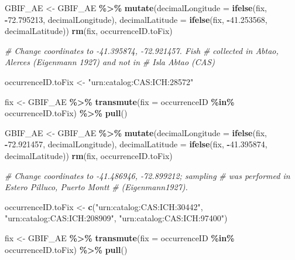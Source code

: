 \documentclass[sn-apa,pdflatex]{sn-jnl}
\newenvironment{Shaded}{\begin{snugshade}}{\end{snugshade}}
\newcommand{\AttributeTok}[1]{\textcolor[rgb]{0.13,0.29,0.53}{#1}}
\newcommand{\CommentTok}[1]{\textcolor[rgb]{0.56,0.35,0.01}{\textit{#1}}}
\newcommand{\FloatTok}[1]{\textcolor[rgb]{0.00,0.00,0.81}{#1}}
\newcommand{\FunctionTok}[1]{\textcolor[rgb]{0.13,0.29,0.53}{\textbf{#1}}}
\newcommand{\NormalTok}[1]{#1}
\newcommand{\OtherTok}[1]{\textcolor[rgb]{0.56,0.35,0.01}{#1}}
\newcommand{\SpecialCharTok}[1]{\textcolor[rgb]{0.81,0.36,0.00}{\textbf{#1}}}
\newcommand{\StringTok}[1]{\textcolor[rgb]{0.31,0.60,0.02}{#1}}
\begin{document}
\begin{Shaded}
\begin{Highlighting}[]
\NormalTok{GBIF\_AE }\OtherTok{\textless{}{-}}\NormalTok{ GBIF\_AE }\SpecialCharTok{\%\textgreater{}\%}
    \FunctionTok{mutate}\NormalTok{(}\AttributeTok{decimalLongitude =} \FunctionTok{ifelse}\NormalTok{(fix, }\SpecialCharTok{{-}}\FloatTok{72.795213}\NormalTok{, decimalLongitude),}
        \AttributeTok{decimalLatitude =} \FunctionTok{ifelse}\NormalTok{(fix, }\SpecialCharTok{{-}}\FloatTok{41.253568}\NormalTok{, decimalLatitude))}
\FunctionTok{rm}\NormalTok{(fix, occurrenceID.toFix)}

\CommentTok{\# Change coordinates to {-}41.395874, {-}72.921457. Fish}
\CommentTok{\# collected in Abtao, Alerces (Eigenmann 1927) and not in}
\CommentTok{\# Isla Abtao (CAS)}

\NormalTok{occurrenceID.toFix }\OtherTok{\textless{}{-}} \StringTok{"urn:catalog:CAS:ICH:28572"}

\NormalTok{fix }\OtherTok{\textless{}{-}}\NormalTok{ GBIF\_AE }\SpecialCharTok{\%\textgreater{}\%}
    \FunctionTok{transmute}\NormalTok{(}\AttributeTok{fix =}\NormalTok{ occurrenceID }\SpecialCharTok{\%in\%}\NormalTok{ occurrenceID.toFix) }\SpecialCharTok{\%\textgreater{}\%}
    \FunctionTok{pull}\NormalTok{()}

\NormalTok{GBIF\_AE }\OtherTok{\textless{}{-}}\NormalTok{ GBIF\_AE }\SpecialCharTok{\%\textgreater{}\%}
    \FunctionTok{mutate}\NormalTok{(}\AttributeTok{decimalLongitude =} \FunctionTok{ifelse}\NormalTok{(fix, }\SpecialCharTok{{-}}\FloatTok{72.921457}\NormalTok{, decimalLongitude),}
        \AttributeTok{decimalLatitude =} \FunctionTok{ifelse}\NormalTok{(fix, }\SpecialCharTok{{-}}\FloatTok{41.395874}\NormalTok{, decimalLatitude))}
\FunctionTok{rm}\NormalTok{(fix, occurrenceID.toFix)}

\CommentTok{\# Change coordinates to {-}41.486946, {-}72.899212; sampling}
\CommentTok{\# was performed in Estero Pilluco, Puerto Montt}
\CommentTok{\# (Eigenmann1927).}

\NormalTok{occurrenceID.toFix }\OtherTok{\textless{}{-}} \FunctionTok{c}\NormalTok{(}\StringTok{"urn:catalog:CAS:ICH:30442"}\NormalTok{, }\StringTok{"urn:catalog:CAS:ICH:208909"}\NormalTok{,}
    \StringTok{"urn:catalog:CAS:ICH:97400"}\NormalTok{)}

\NormalTok{fix }\OtherTok{\textless{}{-}}\NormalTok{ GBIF\_AE }\SpecialCharTok{\%\textgreater{}\%}
    \FunctionTok{transmute}\NormalTok{(}\AttributeTok{fix =}\NormalTok{ occurrenceID }\SpecialCharTok{\%in\%}\NormalTok{ occurrenceID.toFix) }\SpecialCharTok{\%\textgreater{}\%}
    \FunctionTok{pull}\NormalTok{()}


\end{Highlighting}
\end{Shaded}
\end{document}
